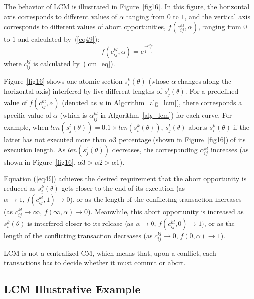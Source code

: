 \documentclass[12pt,english]{report}
\begin{document}
The behavior of LCM is illustrated in Figure~\ref{fig16}. In this figure, the horizontal axis corresponds to different values of $\alpha$ ranging from $0$ to $1$, and the vertical axis corresponds to different values of abort opportunities, $f(c_{ij}^{kl},\alpha)$, ranging from $0$ to $1$ and calculated by~(\ref{eq49}):
\begin{equation}
f(c_{ij}^{kl},\alpha)=e^{\frac{-c_{ij}^{kl}\alpha}{1-\alpha}}
\label{eq49}\end{equation}
where $c_{ij}^{kl}$ is calculated by~(\ref{cm_eq}).

Figure~\ref{fig16} shows one atomic section $s_i^k(\theta)$ (whose $\alpha$ changes along the horizontal axis) interfered by five different lengths of $s_j^l(\theta)$.
For a predefined value of $f(c_{ij}^{kl},\alpha)$ (denoted as $\psi$ in Algorithm~\ref{alg_lcm}), there corresponds a specific value of $\alpha$ (which is $\alpha_{ij}^{kl}$ in Algorithm~\ref{alg_lcm}) for each curve. For example, when $len(s_j^l(\theta))=0.1 \times len(s_i^k(\theta))$, $s_j^l(\theta)$ aborts $s_i^k(\theta)$ if the latter has not executed more than $\alpha3$ percentage (shown in Figure~\ref{fig16}) of its execution length. As $len(s_{j}^{l}(\theta))$ decreases, the corresponding $\alpha_{ij}^{kl}$ increases (as shown in Figure~\ref{fig16}, $\alpha3>\alpha2>\alpha1$).

Equation (\ref{eq49}) achieves the desired requirement that the abort opportunity is reduced as $s_{i}^{k}(\theta)$ gets
closer to the end of its execution (as $\alpha\rightarrow1,\, f(c_{ij}^{kl},1)\rightarrow0$),
or as the length of the conflicting transaction increases (as $c_{ij}^{kl}\rightarrow\infty,\, f(\infty,\alpha)\rightarrow0$).
Meanwhile, this abort opportunity is increased as $s_{i}^{k}(\theta)$
is interfered closer to its release (as $\alpha\rightarrow0,\, f(c_{ij}^{kl},0)\rightarrow1$),
or as the length of the conflicting transaction decreases (as $c_{ij}^{kl}\rightarrow0,\, f(0,\alpha)\rightarrow1$).

LCM is not a centralized CM, which means that, upon a conflict, each transactions has to decide whether it must commit or abort.

\subsection{LCM Illustrative Example}
\end{document}

